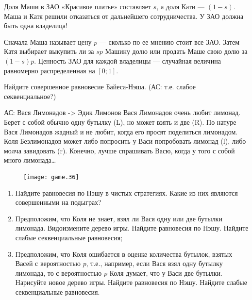 \begin{problem}
Доля Маши в ЗАО «Красивое платье» составляет  $s$, а доля Кати —  $\left(1-s\right)$. Маша и Катя решили отказаться от дальнейшего сотрудничества. У ЗАО должна быть одна владелица!\par
Сначала Маша называет цену  $p$  — сколько по ее мнению стоит все ЗАО. Затем Катя выбирает выкупить ли за  $sp$  Машину долю или продать Маше свою долю за  $\left(1-s\right)p$.
Ценность ЗАО для каждой владелицы — случайная величина равномерно распределенная на  $\left[0;1\right]$.\par
Найдите совершенное равновесие Байеса-Нэша. ({\red АС: т.е. слабое секвенциальное?})\par



\begin{sol}

\end{sol}
\end{problem}





\begin{problem}
{\red АС: Вася Лимонадов -> Эдик Лимонов}
Вася Лимонадов очень любит лимонад. Берет с собой обычно одну бутылку (L), но может взять и две (R). По натуре Вася Лимонадов жадный и не любит, когда его просят поделиться лимонадом. Коля Безлимонадов может либо попросить у Васи попробовать лимонад (l), либо молча завидовать (r). Конечно, лучше спрашивать Васю, когда у того с собой много лимонада\ldots \par
\begin{figure}[htbp]
     \texttt{[image: game.36]}
\end{figure}\par


\begin{enumerate}
\item Найдите равновесия по Нэшу в чистых стратегиях. Какие из них являются совершенными на подыграх?\par
\item Предположим, что Коля не знает, взял ли Вася одну или две бутылки лимонада. Видоизмените дерево игры. Найдите равновесия по Нэшу. Найдите слабые секвенциальные равновесия;\par
\item  Предположим, что Коля ошибается в оценке количества бутылок, взятых Васей с вероятностью  $p$, т.е., например, если Вася взял одну бутылку лимонада, то с вероятностью  $p$  Коля думает, что у Васи две бутылки. Нарисуйте новое дерево игры. Найдите равновесия по Нэшу. Найдите слабые секвенциальные равновесия.\par
\end{enumerate}


\begin{sol}

\end{sol}
\end{problem}



